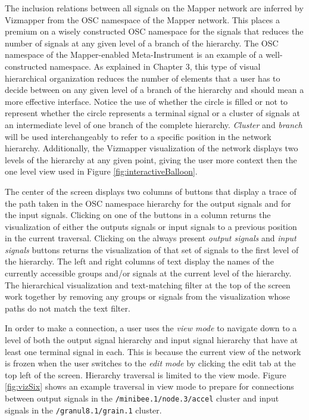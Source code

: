 The inclusion relations between all signals on the Mapper network are inferred by Vizmapper from the OSC namespace of the Mapper network. This places a premium on a wisely constructed OSC namespace for the signals that reduces the number of signals at any given level of a branch of the hierarchy. The OSC namespace of the Mapper-enabled Meta-Instrument is an example of a well-constructed namespace. As explained in Chapter 3, this type of visual hierarchical organization reduces the number of elements that a user has to decide between on any given level of a branch of the hierarchy and should mean a more effective interface. Notice the use of whether the circle is filled or not to represent whether the circle represents a terminal signal or a cluster of signals at an intermediate level of one branch of the complete hierarchy. \emph{Cluster} and \emph{branch} will be used interchangeably to refer to a specific position in the network hierarchy. Additionally, the Vizmapper visualization of the network displays two levels of the hierarchy at any given point, giving the user more context then the one level view used in Figure \ref{fig:interactiveBalloon}.

The center of the screen displays two columns of buttons that display a trace of the path taken in the OSC namespace hierarchy for the output signals and for the input signals. Clicking on one of the buttons in a column returns the visualization of either the outputs signals or input signals to a previous position in the current traversal. Clicking on the always present \emph{output signals} and \emph{input signals} buttons returns the visualization of that set of signals to the first level of the hierarchy. The left and right columns of text display the names of the currently accessible groups and/or signals at the current level of the hierarchy. The hierarchical visualization and text-matching filter at the top of the screen work together by removing any groups or signals from the visualization whose paths do not match the text filter.

In order to make a connection, a user uses the \emph{view mode} to navigate down to a level of both the output signal hierarchy and input signal hierarchy that have at least one terminal signal in each. This is because the current view of the network is frozen when the user switches to the \emph{edit mode} by clicking the edit tab at the top left of the screen. Hierarchy traversal is limited to the view mode. Figure \ref{fig:vizSix} shows an example traversal in view mode to prepare for connections between output signals in the \verb#/minibee.1/node.3/accel# cluster and input signals in the \verb#/granul8.1/grain.1# cluster.

